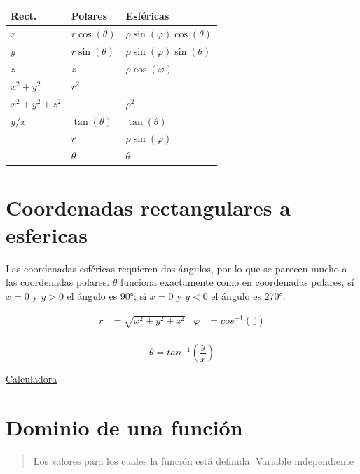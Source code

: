 \documentclass[11pt]{article}
\begin{document}
\begin{OVERFLOW}
\begin{center}
\begin{tabular}{lll}
Rect. & Polares & Esféricas\\
\hline
\(x\) & \(r \cos(\theta)\) & \(\rho \sin(\varphi)\cos(\theta)\)\\
\(y\) & \(r \sin(\theta)\) & \(\rho \sin(\varphi)\sin(\theta)\)\\
\(z\) & \(z\) & \(\rho \cos(\varphi)\)\\
\(x^2+y^2\) & \(r^2\) & \\
\(x^2+y^2+z^2\) &  & \(\rho^2\)\\
\(y/x\) & \(\tan(\theta)\) & \(\tan(\theta)\)\\
 & \(r\) & \(\rho \sin(\varphi)\)\\
 & \(\theta\) & \(\theta\)\\
\end{tabular}
\end{center}
\end{OVERFLOW}

\section{Coordenadas rectangulares a esfericas}
\label{sec:orgd28ba87}
Las coordenadas esféricas requieren dos ángulos, por lo que se parecen mucho a las coordenadas polares. \(\theta\) funciona exactamente como en coordenadas polares, sí \(x=0\) y \(y > 0\) el ángulo es 90°; sí \(x=0\) y \(y < 0\) el ángulo es 270°.

\begin{DEMONSTRATION}
\[ \begin{aligned} 
r &= \sqrt{x^2+y^2+z^2} & \varphi &= cos^{-1}\left( \frac{z}{r} \right) \\
\end{aligned} 
\]

\[\theta = tan^{-1}\left( \frac{y}{x} \right)\]
\end{DEMONSTRATION}
\href{http://www.learningaboutelectronics.com/Articulos/Calculadora-de-conversion-de-coordenadas-cartesianas-a-esfericas.php\#respuesta}{Calculadora}


\section{Dominio de una función}
\label{sec:org8660baa}
\begin{quote}
Los valores para los cuales la función está definida. Variable independiente
\end{quote}
\end{document}
